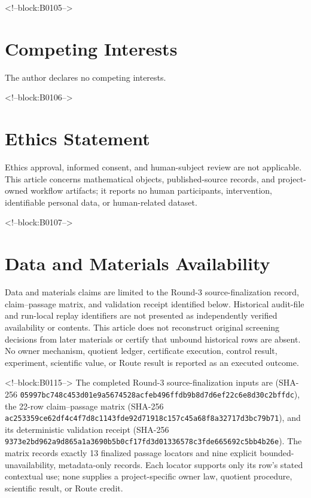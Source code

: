 \documentclass[11pt,a4paper]{article}
\begin{document}
<!--block:B0105-->
\section*{Competing Interests}
The author declares no competing interests.

<!--block:B0106-->
\section*{Ethics Statement}
Ethics approval, informed consent, and human-subject review are not applicable. This article concerns mathematical objects, published-source records, and project-owned workflow artifacts; it reports no human participants, intervention, identifiable personal data, or human-related dataset.

<!--block:B0107-->
\section*{Data and Materials Availability}
\begingroup\sloppy
Data and materials claims are limited to the Round-3 source-finalization record, claim--passage matrix, and validation receipt identified below. Historical audit-file and run-local replay identifiers are not presented as independently verified availability or contents. This article does not reconstruct original screening decisions from later materials or certify that unbound historical rows are absent. No owner mechanism, quotient ledger, certificate execution, control result, experiment, scientific value, or Route result is reported as an executed outcome.

<!--block:B0115-->
The completed Round-3 source-finalization inputs are
 (SHA-256
\texttt{05997bc7\allowbreak{}48c453d0\allowbreak{}1e9a5674\allowbreak{}528acfeb\allowbreak{}496ffdb9\allowbreak{}b8d7d6ef\allowbreak{}22c6e8d3\allowbreak{}0c2bffdc}), the 22-row claim--passage matrix
 (SHA-256
\texttt{ac253359\allowbreak{}ce62df4c\allowbreak{}4f7d8c11\allowbreak{}43fde92d\allowbreak{}71918c15\allowbreak{}7c45a68f\allowbreak{}8a32717d\allowbreak{}3bc79b71}), and its deterministic validation receipt
 (SHA-256
\texttt{9373e2bd\allowbreak{}962a9d86\allowbreak{}5a1a3690\allowbreak{}b5b0cf17\allowbreak{}fd3d0133\allowbreak{}6578c3fd\allowbreak{}e665692c\allowbreak{}5bb4b26e}).  The matrix records exactly 13 finalized
passage locators and nine explicit bounded-unavailability, metadata-only records.
Each locator supports only its row's stated contextual use; none supplies a
project-specific owner law, quotient procedure, scientific result, or Route credit.
\par\endgroup
\end{document}
